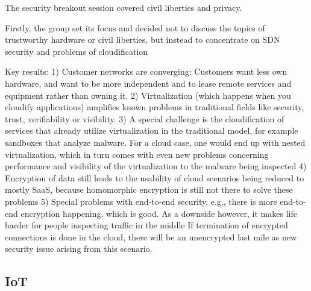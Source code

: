 The security breakout session covered civil liberties and privacy.

Firstly, the group set its focus and decided not to discuss the topics of
trustworthy hardware or civil liberties, but instead to concentrate on SDN
security and problems of cloudification

Key results: 1) Customer networks are converging:  Customers want less own
hardware, and want to be more independent and to lease remote services and
equipment rather than owning it.  2) Virtualization (which happens when you
cloudify applications) amplifies known problems in traditional fields like
security, trust, verifiability or visibility.  3) A special challenge is the
cloudification of services that already utilize virtualization in the
traditional model, for example sandboxes that analyze malware.  For a cloud
case, one would end up with nested virtualization, which in turn comes with
even new problems concerning performance and visibility of the virtualization
to the malware being inspected 4) Encryption of data still leads to the
usability of cloud scenarios being reduced to mostly SaaS, because homomorphic
encryption is still not there to solve these problems 5) Special problems with
end-to-end security, e.g., there is more end-to-end encryption happening,
which is good.  As a downside however, it makes life harder for people
inspecting traffic in the middle If termination of encrypted connections is
done in the cloud, there will be an unencrypted last mile as new security
issue arising from this scenario.

\subsection{IoT}
